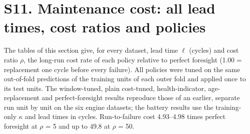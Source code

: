 \documentclass[11pt,a4paper]{article}
\begin{document}
\section*{S11. Maintenance cost: all lead times, cost ratios and policies}

\noindent The tables of this section give, for every dataset, lead time $\ell$ (cycles) and cost ratio $\rho$, the long-run cost rate of each policy relative to perfect foresight (1.00 = replacement one cycle before every failure). All policies were tuned on the same out-of-fold predictions of the training units of each outer fold and applied once to its test units. The window-tuned, plain cost-tuned, health-indicator, age-replacement and perfect-foresight results reproduce those of an earlier, separate run unit by unit on the six engine datasets; the battery results use the training-only $\kappa$ and lead times in cycles. Run-to-failure cost 4.93--4.98 times perfect foresight at $\rho$ = 5 and up to 49.8 at $\rho$ = 50.
\end{document}
